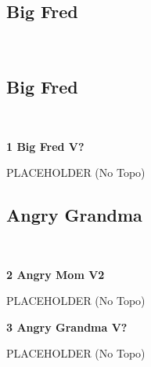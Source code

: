 \begin{multicols*}{2}
		\section{Big Fred}\label{sa:Big Fred}
	\begin{minipage}{\columnwidth}
	\
	\end{minipage}
			\subsection*{Big Fred}\label{bf:Big Fred}
			\begin{minipage}{\columnwidth}
			\
			\end{minipage}
			
					\label{rt:Big Fred}\colorbox{black!20}{\textbf{1 Big Fred V?  }}
					\begin{adjustwidth}{0.5cm}{}
					\begin{minipage}{\linewidth}					
					PLACEHOLDER
						\newline (No Topo) 
					\end{minipage}
					\end{adjustwidth}
			\subsection*{Angry Grandma}\label{bf:Angry Grandma}
			\begin{minipage}{\columnwidth}
			\
			\end{minipage}
			
					\label{rt:Angry Mom}\colorbox{green!20}{\textbf{2 Angry Mom V2  }}
					\begin{adjustwidth}{0.5cm}{}
					\begin{minipage}{\linewidth}					
					PLACEHOLDER
						\newline (No Topo) 
					\end{minipage}
					\end{adjustwidth}
					\label{rt:Angry Grandma}\colorbox{black!20}{\textbf{3 Angry Grandma V?  }}
					\begin{adjustwidth}{0.5cm}{}
					\begin{minipage}{\linewidth}					
					PLACEHOLDER
						\newline (No Topo) 
					\end{minipage}
					\end{adjustwidth}
\end{multicols*}
\clearpage
